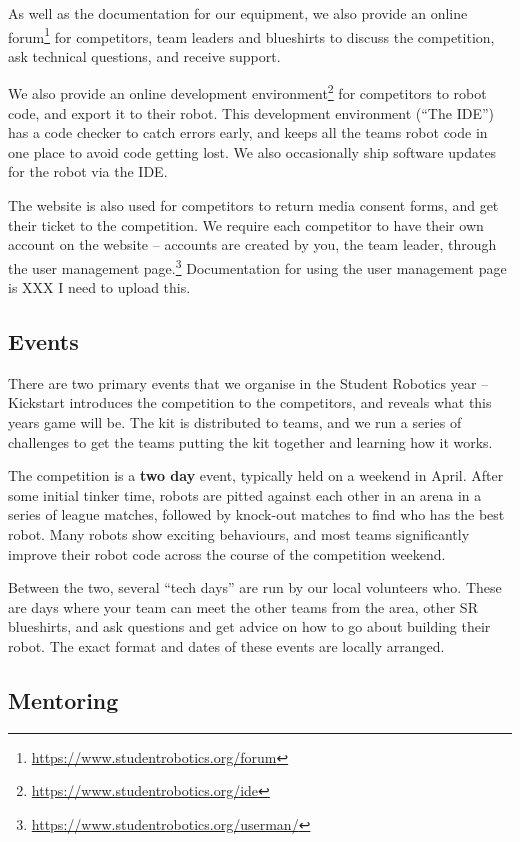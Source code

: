 \documentclass[a4paper]{article}
\begin{document}
As well as the documentation for our equipment, we also provide an online
forum\footnote{\url{https://www.studentrobotics.org/forum}} for competitors,
team leaders and blueshirts to discuss the competition, ask technical questions,
and receive support.

We also provide an online development
environment\footnote{\url{https://www.studentrobotics.org/ide}} for competitors
to robot code, and export it to their robot. This development environment
(``The IDE'') has a code checker to catch errors early, and keeps all the
teams robot code in one place to avoid code getting lost. We also occasionally
ship software updates for the robot via the IDE.

The website is also used for competitors to return media consent forms, and
get their ticket to the competition. We require each competitor to have their
own account on the website -- accounts are created by you, the team leader,
through the user management
page.\footnote{\url{https://www.studentrobotics.org/userman/}} Documentation
for using the user management page is XXX I need to upload this.

\subsection*{Events}

There are two primary events that we organise in the Student Robotics year --
Kickstart introduces the competition to the competitors, and reveals what this
years game will be. The kit is distributed to teams, and we run a series of
challenges to get the teams putting the kit together and learning how it works.

The competition is a \textbf{two day} event, typically held on a weekend in
April. After some initial tinker time, robots are pitted against each other in
an arena in a series of league matches, followed by knock-out matches to find
who has the best robot. Many robots show exciting behaviours, and most teams
significantly improve their robot code across the course of the competition
weekend.

Between the two, several ``tech days'' are run by our local volunteers who.
These are days where your team can meet the other teams from the area, other SR
blueshirts, and ask questions and get advice on how to go about building their
robot. The exact format and dates of these events are locally arranged.

\subsection*{Mentoring}
\end{document}
